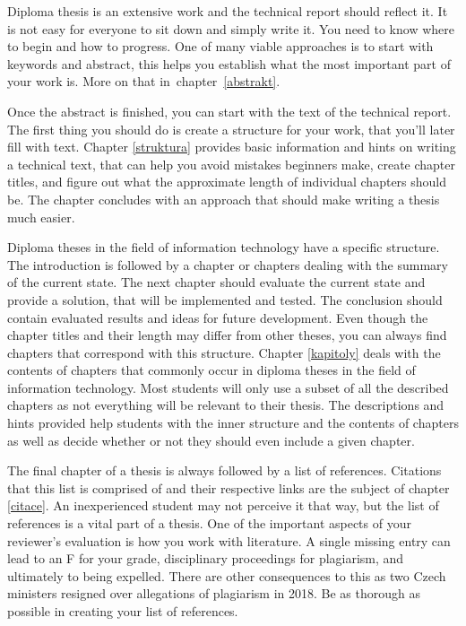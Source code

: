 Diploma thesis is an extensive work and the technical report should reflect it. It is not easy for everyone to sit down and simply write it. You need to know where to begin and how to progress. One of many viable approaches is to start with keywords and abstract, this helps you establish what the most important part of your work is. More on that in~chapter~\ref{abstrakt}.

Once the abstract is finished, you can start with the text of the technical report. The first thing you should do is create a structure for your work, that you'll later fill with text. Chapter \ref{struktura} provides basic information and hints on writing a technical text, that can help you avoid mistakes beginners make, create chapter titles, and figure out what the approximate length of individual chapters should be. The chapter concludes with an approach that should make writing a thesis much easier.

Diploma theses in the field of information technology have a specific structure. The introduction is followed by a chapter or chapters dealing with the summary of the current state. The next chapter should evaluate the current state and provide a solution, that will be implemented and tested. The conclusion should contain evaluated results and ideas for future development. Even though the chapter titles and their length may differ from other theses, you can always find chapters that correspond with this structure. Chapter \ref{kapitoly} deals with the contents of chapters that commonly occur in diploma theses in the field of information technology. Most students will only use a subset of all the described chapters as not everything will be relevant to their thesis. The descriptions and hints provided help students with the inner structure and the contents of chapters as well as decide whether or not they should even include a given chapter. 

The final chapter of a thesis is always followed by a list of references. Citations that this list is comprised of and their respective links are the subject of chapter \ref{citace}. An inexperienced student may not perceive it that way, but the list of references is a vital part of a thesis. One of the important aspects of your reviewer's evaluation is how you work with literature. A single missing entry can lead to an F for your grade, disciplinary proceedings for plagiarism, and ultimately to being expelled. There are other consequences to this as two Czech ministers resigned over allegations of plagiarism in 2018. Be as thorough as possible in creating your list of references.

